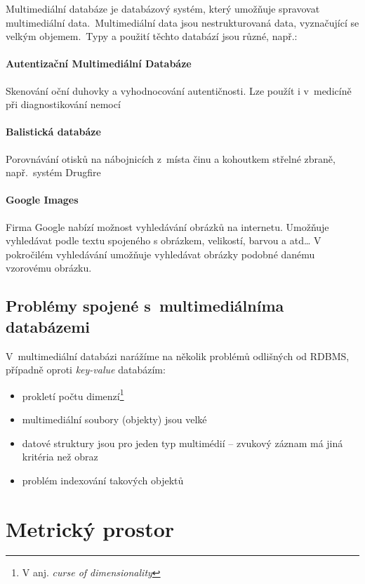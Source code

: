 Multimediální databáze je databázový systém, který umožňuje spravovat
multimediální data\@.~Multimediální data jsou nestrukturovaná data,
vyznačující se velkým objemem\@.~Typy a použití těchto databází
jsou různé, např.:


\paragraph{Autentizační Multimediální Databáze}

Skenování oční duhovky a vyhodnocování autentičnosti\@. Lze použít
i v~medicíně při diagnostikování nemocí


\paragraph{Balistická databáze}

Porovnávání otisků na nábojnicích z~místa činu a kohoutkem střelné
zbraně, např.~systém Drugfire\cite{drugfire}

\paragraph{Google Images}

Firma Google nabízí možnost vyhledávání obrázků na internetu.
Umožňuje vyhledávat podle textu spojeného s obrázkem, velikostí, barvou a atd\ldots{}
V pokročilém vyhledávání umožňuje vyhledávat obrázky podobné danému vzorovému obrázku\cite{miller2011using}.

\subsection{Problémy spojené s~multimediálníma databázemi}

V~multimediální databázi narážíme na několik problémů odlišných od
 RDBMS, případně oproti \emph{key-value} databázím\cite{no-sql}:
\begin{itemize}
\item prokletí počtu dimenzí\cite{Bellman195706}\footnote{V anj. \emph{curse of dimensionality}}
\item multimediální soubory (objekty) jsou velké
\item datové struktury jsou pro jeden typ multimédií -- zvukový záznam
má jiná kritéria než obraz
\item problém indexování takových objektů
\end{itemize}

\section{Metrický prostor}


